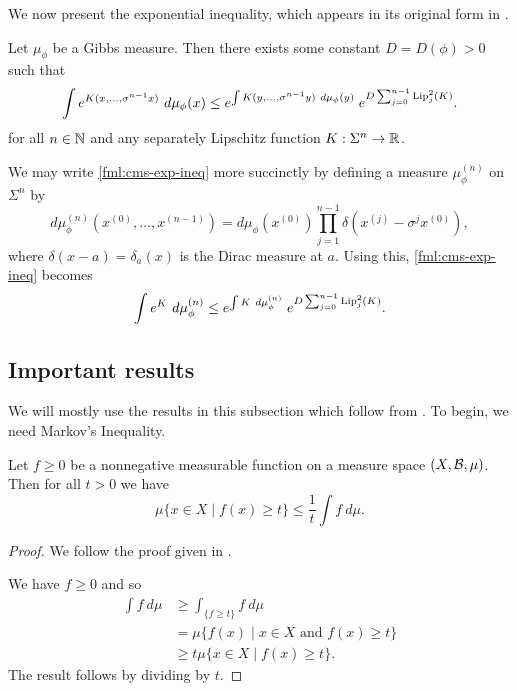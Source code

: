 We now present the exponential inequality, which appears in its original form in \cite[Theorem I.1]{collet-martinez-schmitt:exp-ineq}.

\begin{theorem}\label{thm:cm-3-1}
	Let $\mu_\phi$ be a Gibbs measure. Then there exists some constant $D = D(\phi) > 0$ such that
	\begin{equation}\label{fml:cms-exp-ineq}
		\int{e^{K(x, \dots, \sigma^{n - 1}{x})}\ d\mu_\phi(x)} \leq e^{\int{K(y, \dots, \sigma^{n - 1}{y})\ d\mu_\phi(y)}} \; e^{D \sum_{j = 0}^{n - 1}{\operatorname{Lip}_j^2(K)}}.
	\end{equation}
	 for all $n \in \mathbb{N}$ and any separately Lipschitz function $K : \Sigma^n \to \mathbb{R}$.
\end{theorem}

We may write \eqref{fml:cms-exp-ineq} more succinctly by defining a measure $\mu_\phi^{(n)}$ on $\Sigma^n$ by
\[
	d\mu_\phi^{(n)}(x^{(0)}, \dots, x^{(n - 1)}) = d\mu_\phi(x^{(0)}) \prod_{j = 1}^{n - 1}{\delta(x^{(j)} - \sigma^j{x^{(0)}})},
\]
where $\delta(x - a) = \delta_a(x)$ is the Dirac measure at $a$. Using this, \eqref{fml:cms-exp-ineq} becomes
\[
	\int{e^K\ d\mu_\phi^{(n)}} \leq e^{\int{K\ d\mu_\phi^{(n)}}} \; e^{D \sum_{j = 0}^{n - 1}{\Lip_j^2(K)}}.
\]

\subsection{Important results}
We will mostly use the results in this subsection which follow from . To begin, we need Markov's Inequality.

\begin{lemma}\label{lem:markov-ineq}
	Let $f \geq 0$ be a nonnegative measurable function on a measure space $(X, \mathcal{B}, \mu)$. Then for all $t > 0$ we have
	\[
		\mu\{x \in X \mid f(x) \geq t\} \leq \frac{1}{t}\int{f\ d\mu}.
	\]
	
	\begin{proof}
		We follow the proof given in \cite[Theorem 3.1.1]{athreya-lahiri:measure-theory}.
		
		We have $f \geq 0$ and so
		\begin{align*}
			\int{f\ d\mu} &\geq \int_{\{f \geq t\}}{f\ d\mu} \\ &= \mu\{f(x) \mid x \in X \text{ and } f(x) \geq t \} \\ &\geq t\mu\{x \in X \mid f(x) \geq t \}.
		\end{align*}
		The result follows by dividing by $t$.
	\end{proof}
\end{lemma}

